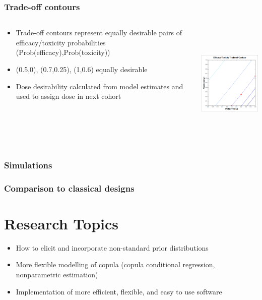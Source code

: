 \documentclass{beamer}
\begin{document}
	\begin{frame}
		\frametitle{Trade-off contours} 
		\begin{columns}[T]
			\begin{column}{.5\textwidth}			
				\begin{itemize}
					\setlength\itemsep{1em}
					\item Trade-off contours represent equally desirable pairs of efficacy/toxicity probabilities (Prob(efficacy),Prob(toxicity))
					\item (0.5,0), (0.7,0.25), (1,0.6) equally desirable
					\item Dose desirability calculated from model estimates and used to assign dose in next cohort
				\end{itemize}
			\end{column}
			\begin{column}{.5\textwidth}
				\includegraphics[height=5.8cm]{fig/image046}
			\end{column}
		\end{columns}		
	\end{frame}	

	\begin{frame}
		\frametitle{Simulations}
	\end{frame}	
	
	\begin{frame}
		\frametitle{Comparison to classical designs} 
	\end{frame}	
	
\section{Research Topics}

	\begin{frame}
		\begin{itemize}
			\setlength\itemsep{2em}
			\item How to elicit and incorporate non-standard prior distributions
			\item More flexible modelling of copula (copula conditional regression, nonparametric estimation)
			\item Implementation of more efficient, flexible, and easy to use software 
		\end{itemize}
		\begin{center}
		\end{center}
	\end{frame}
\end{document}
